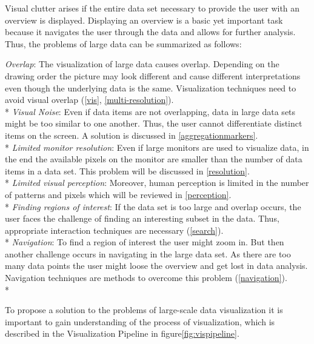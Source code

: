  Visual clutter arises if the entire data set necessary to provide the user with an overview is displayed. Displaying an overview is a basic yet important task because it navigates the user through the data and allows for further analysis. Thus, the problems of large data can be summarized as follows: 
\par
\textit{Overlap}: 
The visualization of large data causes overlap. Depending on the drawing order the picture may look different and cause different interpretations even though the underlying data is the same. Visualization techniques need to avoid visual overlap (\ref{vis}, \ref{multi-resolution}). 
\\*
\textit{Visual Noise}: 
Even if data items are not overlapping, data in large data sets might be too similar to one another. Thus, the user cannot differentiate distinct items on the screen. A solution is discussed in \ref{aggregationmarkers}.
\\*
\textit{Limited monitor resolution}:
Even if large monitors are used to visualize data, in the end the available pixels on the monitor are smaller than the number of data items in a data set. This problem will be discussed in \ref{resolution}.
\\*
\textit{Limited visual perception}:
Moreover, human perception is limited in the number of patterns and pixels which will be reviewed in \ref{perception}.
\\*
\textit{Finding regions of interest}:
If the data set is too large and overlap occurs, the user faces the challenge of finding an interesting subset in the data. Thus, appropriate interaction techniques are necessary (\ref{search}).
\\*
\textit{Navigation}:
To find a region of interest the user might zoom in. But then another challenge occurs in navigating in the large data set. As there are too many data points the user might loose the overview and get lost in data analysis. Navigation techniques are methods to overcome this problem (\ref{navigation}).
\\*
\par
To propose a solution to the problems of large-scale data visualization it is important to gain understanding of the process of visualization, which is described in the Visualization Pipeline in figure\ref{fig:vispipeline}. 
